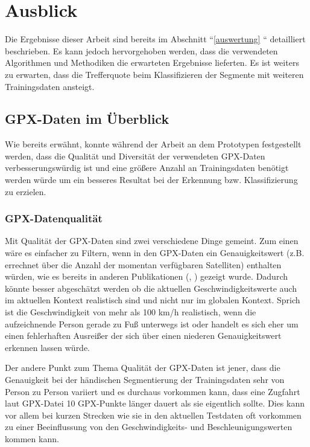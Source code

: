 \chapter{Ausblick}
Die Ergebnisse dieser Arbeit sind bereits im Abschnitt ``\ref{auswertung} `` detailliert beschrieben. Es kann jedoch hervorgehoben werden, dass die verwendeten Algorithmen und Methodiken die erwarteten Ergebnisse lieferten. Es ist weiters zu erwarten, dass die Trefferquote beim Klassifizieren der Segmente mit weiteren Trainingsdaten ansteigt. 

\section{GPX-Daten im Überblick}
Wie bereits erwähnt, konnte während der Arbeit an dem Prototypen festgestellt werden, dass die Qualität und Diversität der verwendeten GPX-Daten verbesserungswürdig ist und eine größere Anzahl an Trainingsdaten benötigt werden würde um ein besseres Resultat bei der Erkennung bzw. Klassifizierung zu erzielen. 

\subsection{GPX-Datenqualität}
Mit Qualität der GPX-Daten sind zwei verschiedene Dinge gemeint. Zum einen wäre es einfacher zu Filtern, wenn in den GPX-Daten ein Genauigkeitswert (z.B. errechnet über die Anzahl der momentan verfügbaren Satelliten) enthalten würden, wie es bereits in anderen Publikationen (\cite{stenneth_transportation_2011}, \cite{nadine_schussler_improving_2011}) gezeigt wurde. Dadurch könnte besser abgeschätzt werden ob die aktuellen Geschwindigkeitswerte auch im aktuellen Kontext realistisch sind und nicht nur im globalen Kontext. Sprich ist die Geschwindigkeit von mehr als 100 km/h realistisch, wenn die aufzeichnende Person gerade zu Fuß unterwegs ist oder handelt es sich eher um einen fehlerhaften Ausreißer der sich über einen niederen Genauigkeitswert erkennen lassen würde.

Der andere Punkt zum Thema Qualität der GPX-Daten ist jener, dass die Genauigkeit bei der händischen Segmentierung der Trainingsdaten sehr von Person zu Person variiert und es durchaus vorkommen kann, dass eine Zugfahrt laut GPX-Datei 10 GPX-Punkte länger dauert als sie eigentlich sollte. Dies kann vor allem bei kurzen Strecken wie sie in den aktuellen Testdaten oft vorkommen zu einer Beeinflussung von den Geschwindigkeits- und Beschleunigungswerten kommen kann. 

